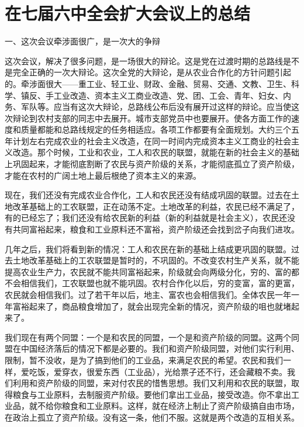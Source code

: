 \section[在七届六中全会扩大会议上的总结（一九五五年）]{在七届六中全会扩大会议上的总结}


一、这次会议牵涉面很广，是一次大的争辩

这次会议，解决了很多问题，是一场很大的辩论。这是党在过渡时期的总路线是不是完全正确的一次大辩论。这次全党的大辩论，是从农业合作化的方针问题引起的。牵涉面很大——重工业、轻工业、财政、金融、贸易、交通、文教、卫生、科学、镇反、手工业改造、资本主义工商业改造、党、团、工会、青年、妇女、内务、军队等。应当有这次大辩论，总路线公布后没有展开过这样的辩论。应当使这次辩论到农村支部的同志中去展开。城市支部党员中也要展开。使各方面工作的速度和质量都能和总路线规定的任务相适应。各项工作都要有全面规划。大约三个五年计划左右完成农业的社会主义改造，在同一时间内完成资本主义工商业的社会主义改造。那个时候，工业和农业，工人和农民的联盟，就能在新的社会主义的基础上巩固起来，才能彻底割断了农民与资产阶级的关系，才能彻底孤立了资产阶级，才能在农村的广阔土地上最后根绝了资本主义的来源。

现在，我们还没有完成农业合作化，工人和农民还没有结成巩固的联盟。过去在土地改革基础上的工农联盟，正在动荡不定。土地改革的利益，农民已经不满足了，有的已经忘了；我们还没有给农民新的利益（新的利益就是社会主义），农民还没有共同富裕起来，粮食和工业原料还不富裕，资产阶级还会找到岔子向我们进攻。

几年之后，我们将看到新的情况：工人和农民在新的基础上结成更巩固的联盟。过去土地改革基础上的工农联盟是暂时的，不巩固的。不改变农村生产关系，就不能提高农业生产力，农民就不能共同富裕起来，阶级就会向两级分化，穷的、富的都不会相信我们，工农联盟也就不能巩固。农村合作化以后，穷的变富，富的更富，农民就会相信我们。过了若干年以后，地主、富农也会相信我们。全体农民一年一年富裕起来了，商品粮食增加了，就会出现完全新的情况，资产阶级的咀也就堵起来了。

我们现在有两个同盟：一个是和农民的同盟，一个是和资产阶级的同盟。这两个同盟在中国经济落后的情况下都是必要的。我们和资产阶级同盟，对他们实行利用、限制，暂不没收，是为了搞到他们的工业品，来满足农民的希望。农民和我们一样，爱吃饭，爱穿衣，很爱东西（工业品），光给票子还不行，还会藏粮不卖。我们利用和资产阶级的同盟，来对付农民的惜售思想。我们又利用和农民的联盟，取得粮食与工业原料，去制服资产阶级。要他们拿出工业品，接受改造。你不拿出工业品，就不给你粮食和工业原料。这样，就在经济上制止了资产阶级搞自由市场，在政治上孤立了资产阶级。没有这一条，他们不服。这就是两个改造的互相关系。


